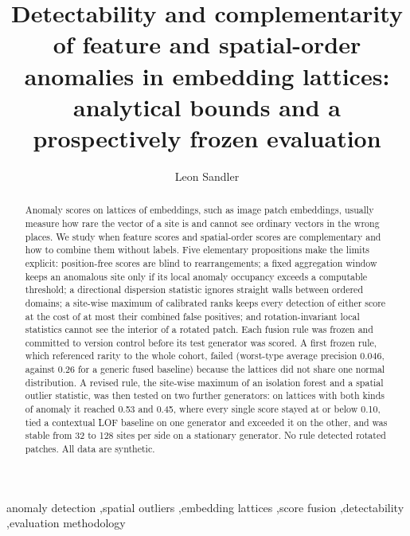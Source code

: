 \documentclass[preprint,review,12pt]{elsarticle}
\begin{document}
\begin{frontmatter}
\title{Detectability and complementarity of feature and spatial-order anomalies in embedding lattices: analytical bounds and a prospectively frozen evaluation}
\author[a]{Leon Sandler}
\address[a]{Independent Researcher, Northbrook, IL, USA}

\begin{abstract}
Anomaly scores on lattices of embeddings, such as image patch embeddings, usually measure how rare the vector of a site is and cannot see ordinary vectors in the wrong places. We study when feature scores and spatial-order scores are complementary and how to combine them without labels. Five elementary propositions make the limits explicit: position-free scores are blind to rearrangements; a fixed aggregation window keeps an anomalous site only if its local anomaly occupancy exceeds a computable threshold; a directional dispersion statistic ignores straight walls between ordered domains; a site-wise maximum of calibrated ranks keeps every detection of either score at the cost of at most their combined false positives; and rotation-invariant local statistics cannot see the interior of a rotated patch. Each fusion rule was frozen and committed to version control before its test generator was scored. A first frozen rule, which referenced rarity to the whole cohort, failed (worst-type average precision 0.046, against 0.26 for a generic fused baseline) because the lattices did not share one normal distribution. A revised rule, the site-wise maximum of an isolation forest and a spatial outlier statistic, was then tested on two further generators: on lattices with both kinds of anomaly it reached 0.53 and 0.45, where every single score stayed at or below 0.10, tied a contextual LOF baseline on one generator and exceeded it on the other, and was stable from 32 to 128 sites per side on a stationary generator. No rule detected rotated patches. All data are synthetic.
\end{abstract}

\begin{keyword}
anomaly detection \sep spatial outliers \sep embedding lattices \sep score fusion \sep detectability \sep evaluation methodology
\end{keyword}
\end{frontmatter}
\end{document}
